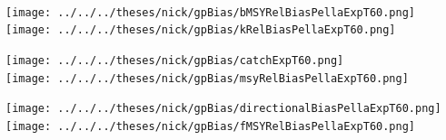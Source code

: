 \documentclass[ xcolor = pdftex, dvipsnames, table ]{beamer}
\begin{document}
%
\begin{frame}%
$~$
\hspace*{-1.25cm}
\begin{minipage}[h!]{0.33\textwidth}
\hspace*{0.25cm}
\texttt{[image: ../../../theses/nick/gpBias/bMSYRelBiasPellaExpT60.png]}\\
\hspace*{0.25cm}
\texttt{[image: ../../../theses/nick/gpBias/kRelBiasPellaExpT60.png]}
\end{minipage}
\begin{minipage}[h!]{0.33\textwidth}
\hspace*{0.75cm}
\texttt{[image: ../../../theses/nick/gpBias/catchExpT60.png]}\\
\hspace*{0.75cm}
\texttt{[image: ../../../theses/nick/gpBias/msyRelBiasPellaExpT60.png]}
\end{minipage}
\begin{minipage}[h!]{0.33\textwidth}
\hspace*{1cm}
\texttt{[image: ../../../theses/nick/gpBias/directionalBiasPellaExpT60.png]}\\
\hspace*{1cm}
\texttt{[image: ../../../theses/nick/gpBias/fMSYRelBiasPellaExpT60.png]}
\end{minipage}
\end{frame}
\end{document}
